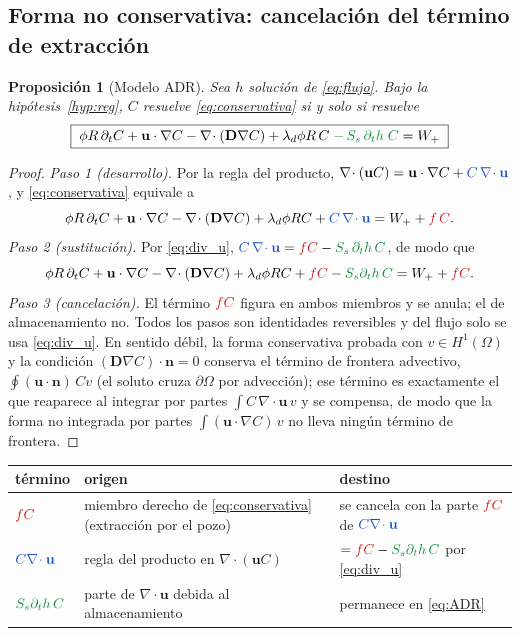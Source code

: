\documentclass[11pt]{article}
\numberwithin{equation}{section}
\theoremstyle{plain}
\newtheorem{proposition}[theorem]{Proposición}
\theoremstyle{definition}
\theoremstyle{remark}
\newcommand{\bu}{\mathbf{u}}
\newcommand{\bD}{\mathbf{D}}
\newcommand{\bn}{\mathbf{n}}
\newcommand{\sumi}[1]{{\color{cSum}#1}}
\newcommand{\divi}[1]{{\color{cDiv}#1}}
\newcommand{\alm}[1]{{\color{cAlm}#1}}
\begin{document}
\subsection{Forma no conservativa: cancelación del término de extracción}
\begin{proposition}[Modelo ADR]\label{prop:ADR}
Sea $h$ solución de \eqref{eq:flujo}. Bajo la hipótesis~\ref{hyp:reg}, $C$ resuelve
\eqref{eq:conservativa} si y solo si resuelve
\begin{equation}
\boxed{\;\phi R\,\partial_tC+\bu\cdot\nabla C-\nabla\!\cdot(\bD\nabla C)
+\lambda_d\phi R\,C\;\alm{-\,S_s\,\partial_th\;C}=W_+\;}
\label{eq:ADR}
\end{equation}
\end{proposition}
\begin{proof}
\emph{Paso 1 (desarrollo).} Por la regla del producto, $\nabla\!\cdot(\bu C)=\bu\cdot\nabla C+\divi{C\,\nabla\!\cdot\bu}$, y
\eqref{eq:conservativa} equivale a
\begin{equation}
\phi R\,\partial_tC+\bu\cdot\nabla C-\nabla\!\cdot(\bD\nabla C)+\lambda_d\phi RC
+\divi{C\,\nabla\!\cdot\bu}=W_++\sumi{f\,C}.
\label{eq:desarrollada}
\end{equation}
\emph{Paso 2 (sustitución).} Por \eqref{eq:div_u}, $\divi{C\,\nabla\!\cdot\bu}=\sumi{fC}-\alm{S_s\,\partial_th\,C}$, de modo que
\[
\phi R\,\partial_tC+\bu\cdot\nabla C-\nabla\!\cdot(\bD\nabla C)+\lambda_d\phi RC
+\sumi{fC}-\alm{S_s\partial_th\,C}=W_++\sumi{fC}.
\]
\emph{Paso 3 (cancelación).} El término $\sumi{fC}$ figura en ambos miembros y se anula; el de almacenamiento no.
Todos los pasos son identidades reversibles y del flujo solo se usa \eqref{eq:div_u}. En sentido débil, la forma conservativa
probada con $v\in H^1(\Omega)$ y la condición $(\bD\nabla C)\cdot\bn=0$ conserva el término de frontera advectivo,
$\oint(\bu\cdot\bn)\,Cv$ (el soluto cruza $\partial\Omega$ por advección); ese término es exactamente el que reaparece al integrar por partes $\int C\,\nabla\!\cdot\bu\,v$ y
se compensa, de modo que la forma no integrada por partes $\int(\bu\cdot\nabla C)\,v$ no lleva ningún término de frontera.
\end{proof}

\begin{center}\small
\begin{tabular}{p{2.5cm}p{5.5cm}p{6.5cm}}
\toprule
término & origen & destino \\
\midrule
$\sumi{fC}$ & miembro derecho de \eqref{eq:conservativa} (extracción por el pozo) & se cancela con la parte $\sumi{fC}$ de $\divi{C\nabla\!\cdot\bu}$ \\
$\divi{C\nabla\!\cdot\bu}$ & regla del producto en $\nabla\!\cdot(\bu C)$ & $=\sumi{fC}-\alm{S_s\partial_th\,C}$ por \eqref{eq:div_u} \\
$\alm{S_s\partial_th\,C}$ & parte de $\nabla\!\cdot\bu$ debida al almacenamiento & permanece en \eqref{eq:ADR} \\
\bottomrule
\end{tabular}
\end{center}
\end{document}
